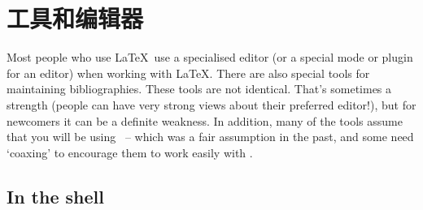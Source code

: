\chapter{工具和编辑器}\label{ch:tools}

Most people who use \LaTeX\ use a specialised editor (or a special
mode or plugin for an editor) when working with \LaTeX. There are also
special tools for maintaining bibliographies. These tools are not
identical. That's sometimes a strength (people can have very strong
views about their preferred editor!), but for newcomers it can be a
definite weakness. In addition, many of the tools assume that you will
be using \bibtex\ -- which was a fair assumption in the past, and some
need `coaxing' to encourage them to work easily with \biblatex.

\section{In the shell}

